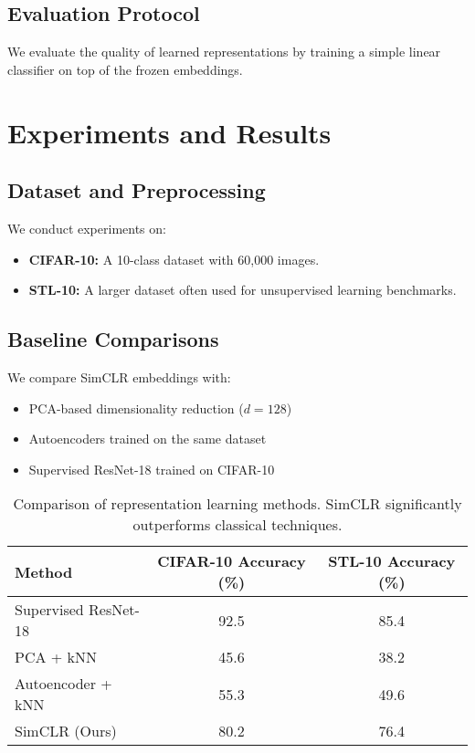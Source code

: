 \documentclass[11pt]{article}
\begin{document}
\subsection{Evaluation Protocol}
We evaluate the quality of learned representations by training a simple linear classifier on top of the
frozen embeddings.

\section{Experiments and Results}

\subsection{Dataset and Preprocessing}
We conduct experiments on:
\begin{itemize}
  \item \textbf{CIFAR-10:} A 10-class dataset with 60,000 images.
  \item \textbf{STL-10:} A larger dataset often used for unsupervised learning benchmarks.
\end{itemize}

\subsection{Baseline Comparisons}
We compare SimCLR embeddings with:
\begin{itemize}
  \item PCA-based dimensionality reduction ($d = 128$)
  \item Autoencoders trained on the same dataset
  \item Supervised ResNet-18 trained on CIFAR-10
\end{itemize}

\begin{table}[h]
\centering
\begin{tabular}{lcc}
\toprule
Method & CIFAR-10 Accuracy (\%) & STL-10 Accuracy (\%) \\
\midrule
Supervised ResNet-18 & 92.5 & 85.4 \\
PCA + kNN & 45.6 & 38.2 \\
Autoencoder + kNN & 55.3 & 49.6 \\
SimCLR (Ours) & 80.2 & 76.4 \\
\bottomrule
\end{tabular}
\caption{Comparison of representation learning methods. SimCLR significantly outperforms classical techniques.}
\end{table}
\end{document}

